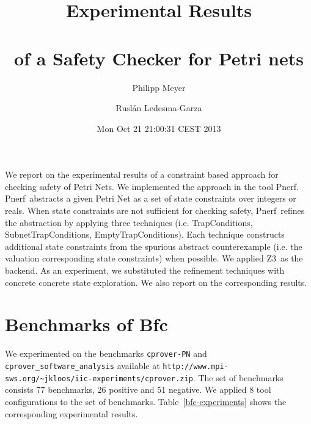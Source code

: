 \documentclass{article}
\newcommand{\bfc}{{\sc Bfc}}
\newcommand{\pnerf}{{\sc Pnerf}}
\newcommand{\zthree}{{\sc Z3}}
\newcommand{\ttt}[1]{\texttt{#1}}
\begin{document}
\title{Experimental Results \\ \mbox{ } \\ of a Safety Checker for Petri nets}
\author{Philipp Meyer \and Rusl\'{a}n Ledesma-Garza}
\date{Mon Oct 21 21:00:31 CEST 2013}

\maketitle

We report on the experimental results of a constraint based
approach for checking safety of Petri Nets.
We implemented the approach in the tool \pnerf. \pnerf\ abstracts a
given Petri Net as a set of state constraints over integers or
reals. When state constraints are not sufficient for checking safety,
\pnerf\ refines the abstraction by applying three techniques (i.e. TrapConditions,
SubnetTrapConditions, EmptyTrapConditions). Each technique constructs additional
state constraints from the spurious abstract
counterexample (i.e. the valuation corresponding state constraints) when possible.
We applied \zthree\ as the backend.
As an experiment, we substituted the refinement techniques with
concrete concrete state exploration. We also report on the
corresponding results.


\section{Benchmarks of \bfc}

We experimented on the benchmarks \ttt{cprover-PN} and
\ttt{cprover\_software\_analysis}
available at
\ttt{http://www.mpi-sws.org/\~{}jkloos/iic-experiments/cprover.zip}.
The set of benchmarks consists 77 benchmarks, 26 positive and 51 negative.
We applied 8 tool configurations to the set of benchmarks.
Table~\ref{bfc-experiments} shows the corresponding experimental results.
\end{document}
